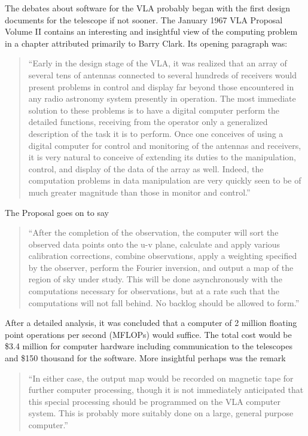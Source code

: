 The debates about software for the VLA probably began with the first
design documents for the telescope if not sooner.  The January 1967
VLA Proposal Volume II contains an interesting and insightful view of
the computing problem in a chapter attributed primarily to Barry
Clark.  Its opening paragraph was:\vspace{-5pt}
\begin{quotation}
``Early in the design stage of the VLA, it was realized that an array of
several tens of antennas connected to several hundreds of receivers
would present problems in control and display far beyond those
encountered in any radio astronomy system presently in operation.  The
most immediate solution to these problems is to have a digital
computer perform the detailed functions, receiving from the operator
only a generalized description of the task it is to perform.  Once one
conceives of using a digital computer for control and monitoring of
the antennas and receivers, it is very natural to conceive of
extending its duties to the manipulation, control, and display of the
data of the array as well.  Indeed, the computation problems in data
manipulation are very quickly seen to be of much greater magnitude
than those in monitor and control.''
\end{quotation}
The Proposal goes on to say\vspace{-5pt}
\begin{quotation}
``After the completion of the observation, the computer will sort the
observed data points onto the u-v plane, calculate and apply various
calibration corrections, combine  observations, apply a weighting
specified by the observer, perform the Fourier inversion, and output a
map of the region of sky under study.  This will be done
asynchronously with the computations necessary for observations, but
at a rate such that the computations will not fall behind.  No backlog
should be allowed to form.''
\end{quotation}
\vspace{-5pt}
After a detailed analysis, it was concluded that a computer of 2
million floating point operations per second (MFLOPs) would suffice.
The total cost would be \$3.4 million for computer hardware including
communication to the telescopes and \$150 thousand for the software.
More insightful perhaps was the remark\vspace{-5pt}
\begin{quotation}
``In either case, the output map would be recorded on magnetic tape for
further computer processing, though it is not immediately anticipated
that this special processing should be programmed on the VLA computer
system.  This is probably more suitably done on a large, general
purpose computer.''
\end{quotation}

